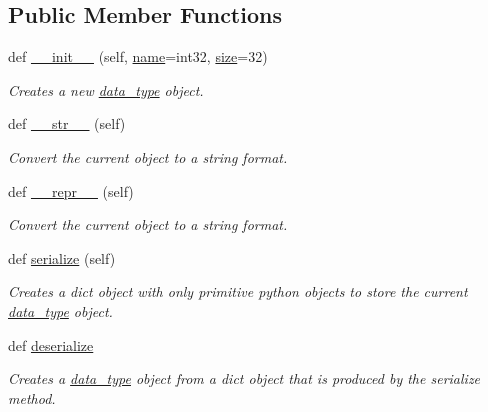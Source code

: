 \subsection*{Public Member Functions}
\begin{DoxyCompactItemize}
\item 
def \hyperlink{classsylva_1_1base_1_1sdf_1_1data__type_a67a4e99823bb60e42cbcefa96230a46d}{\+\_\+\+\_\+init\+\_\+\+\_\+} (self, \hyperlink{classsylva_1_1base_1_1sdf_1_1data__type_a5bb984de0211b07ac2a1a882ff7b1744}{name}=\textquotesingle{}int32\textquotesingle{}, \hyperlink{classsylva_1_1base_1_1sdf_1_1data__type_a76a0420d9704afe37b25895b906128b3}{size}=32)
\begin{DoxyCompactList}\small\item\em Creates a new \hyperlink{classsylva_1_1base_1_1sdf_1_1data__type}{data\+\_\+type} object. \end{DoxyCompactList}\item 
def \hyperlink{classsylva_1_1base_1_1sdf_1_1data__type_a5782362238cdc10794b96462c2753de5}{\+\_\+\+\_\+str\+\_\+\+\_\+} (self)
\begin{DoxyCompactList}\small\item\em Convert the current object to a string format. \end{DoxyCompactList}\item 
def \hyperlink{classsylva_1_1base_1_1sdf_1_1data__type_ab7aca19176b5b02f9cb14295269d9b43}{\+\_\+\+\_\+repr\+\_\+\+\_\+} (self)
\begin{DoxyCompactList}\small\item\em Convert the current object to a string format. \end{DoxyCompactList}\item 
def \hyperlink{classsylva_1_1base_1_1sdf_1_1data__type_a0996089b8e4a7e6ab35bc5f53704f6c4}{serialize} (self)
\begin{DoxyCompactList}\small\item\em Creates a dict object with only primitive python objects to store the current \hyperlink{classsylva_1_1base_1_1sdf_1_1data__type}{data\+\_\+type} object. \end{DoxyCompactList}\item 
def \hyperlink{classsylva_1_1base_1_1sdf_1_1data__type_a8d60e9a84477858f04e552fb02c5a837}{deserialize}
\begin{DoxyCompactList}\small\item\em Creates a \hyperlink{classsylva_1_1base_1_1sdf_1_1data__type}{data\+\_\+type} object from a dict object that is produced by the serialize method. \end{DoxyCompactList}\end{DoxyCompactItemize}
